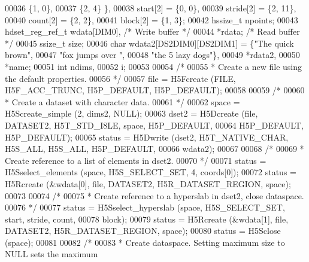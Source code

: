 \begin{DoxyCode}
00036                                          \{1,  0\},
00037                                          \{2,  4\} \},
00038                         start[2] = \{0, 0\},
00039                         stride[2] = \{2, 11\},
00040                         count[2] = \{2, 2\},
00041                         block[2] = \{1, 3\};
00042     hssize\_t            npoints;
00043     hdset\_reg\_ref\_t     wdata[DIM0],                \textcolor{comment}{/* Write buffer */}
00044                         *rdata;                     \textcolor{comment}{/* Read buffer */}
00045     ssize\_t             size;
00046     \textcolor{keywordtype}{char}                wdata2[DS2DIM0][DS2DIM1] = \{\textcolor{stringliteral}{"The quick brown"},
00047                                                     \textcolor{stringliteral}{"fox jumps over "},
00048                                                     \textcolor{stringliteral}{"the 5 lazy dogs"}\},
00049                         *rdata2,
00050                         *name;
00051     \textcolor{keywordtype}{int}                 ndims,
00052                         i;
00053 
00054     \textcolor{comment}{/*}
00055 \textcolor{comment}{     * Create a new file using the default properties.}
00056 \textcolor{comment}{     */}
00057     file = H5Fcreate (FILE, H5F\_ACC\_TRUNC, H5P\_DEFAULT, H5P\_DEFAULT);
00058 
00059     \textcolor{comment}{/*}
00060 \textcolor{comment}{     * Create a dataset with character data.}
00061 \textcolor{comment}{     */}
00062     space = H5Screate\_simple (2, dims2, NULL);
00063     dset2 = H5Dcreate (file, DATASET2, H5T\_STD\_I8LE, space, H5P\_DEFAULT,
00064                 H5P\_DEFAULT, H5P\_DEFAULT);
00065     status = H5Dwrite (dset2, H5T\_NATIVE\_CHAR, H5S\_ALL, H5S\_ALL, H5P\_DEFAULT,
00066                 wdata2);
00067 
00068     \textcolor{comment}{/*}
00069 \textcolor{comment}{     * Create reference to a list of elements in dset2.}
00070 \textcolor{comment}{     */}
00071     status = H5Sselect\_elements (space, H5S\_SELECT\_SET, 4, coords[0]);
00072     status = H5Rcreate (&wdata[0], file, DATASET2, H5R\_DATASET\_REGION, space);
00073 
00074     \textcolor{comment}{/*}
00075 \textcolor{comment}{     * Create reference to a hyperslab in dset2, close dataspace.}
00076 \textcolor{comment}{     */}
00077     status = H5Sselect\_hyperslab (space, H5S\_SELECT\_SET, start, stride, count,
00078                 block);
00079     status = H5Rcreate (&wdata[1], file, DATASET2, H5R\_DATASET\_REGION, space);
00080     status = H5Sclose (space);
00081 
00082     \textcolor{comment}{/*}
00083 \textcolor{comment}{     * Create dataspace.  Setting maximum size to NULL sets the maximum}

\end{DoxyCode}
